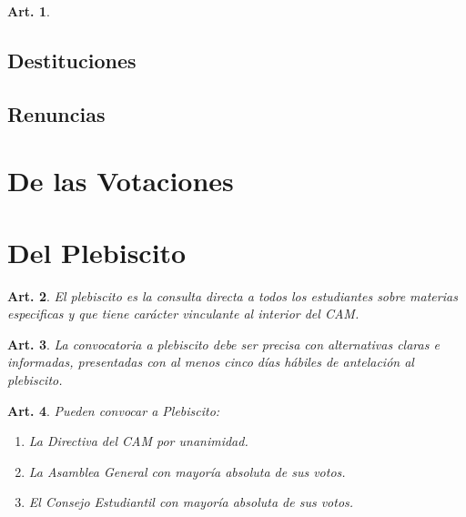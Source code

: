 \documentclass[letterpaper,11pt]{article}
\theoremstyle{plain}
\newtheorem{art}{Art.} %
\begin{document}
\begin{art}\label{} 

\end{art}


\subsection{Destituciones}\label{destituciones}
	
\subsection{Renuncias}\label{renuncias}

\section{De las Votaciones}\label{votaciones}

\section{Del Plebiscito}\label{plebiscito}

\begin{art}\label{plebiscitoDescripcion}
	El plebiscito es la consulta  directa a todos los estudiantes sobre materias especificas y que tiene carácter vinculante al interior del CAM.
\end{art}

\begin{art}\label{plebiscitoAntelacion}
	La convocatoria a plebiscito debe ser precisa con alternativas claras e informadas, presentadas con al menos cinco días hábiles de antelación al plebiscito.
\end{art}

\begin{art}\label{plebiscitoConvocar}
	Pueden convocar a Plebiscito:
	\begin{enumerate}
		\item La Directiva del CAM por unanimidad.
		\item La Asamblea General con mayoría absoluta de sus votos.
		\item El Consejo Estudiantil con mayoría absoluta de sus votos. %
	\end{enumerate}
\end{art}
\end{document}
